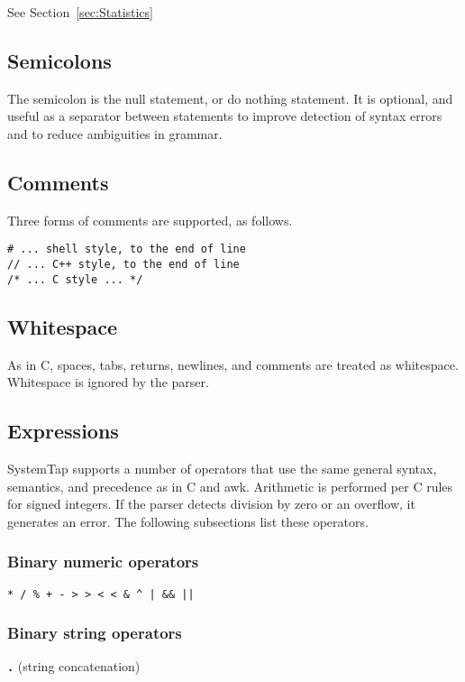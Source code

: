 \documentclass[twoside,english]{article}
\newenvironment{vindent}
{\begin{list}{}{\setlength{\listparindent}{6pt}}
\item[]}
{\end{list}}
\begin{document}
See Section~\ref{sec:Statistics}


\subsection{Semicolons}
\index{;}
The semicolon is the null statement, or do nothing statement. It is optional,
and useful as a separator between statements to improve detection of syntax
errors and to reduce ambiguities in grammar.


\subsection{Comments}
Three forms of comments are supported, as follows.

\begin{vindent}
\begin{verbatim}
# ... shell style, to the end of line
// ... C++ style, to the end of line
/* ... C style ... */
\end{verbatim}
\end{vindent}

\subsection{Whitespace}
As in C, spaces, tabs, returns, newlines, and comments are treated as whitespace.
Whitespace is ignored by the parser.


\subsection{Expressions}
SystemTap supports a number of operators that use the same general syntax,
semantics, and precedence as in C and awk. Arithmetic is performed per C
rules for signed integers. If the parser detects division by zero or an overflow,
it generates an error. The following subsections list these operators.


\subsubsection{Binary numeric operators}
\texttt{{*} / \% + - >\,{}> <\,{}< \& \textasciicircum{}
| \&\& ||}


\subsubsection{Binary string operators}
\texttt{\textbf{.}} (string concatenation)
\end{document}
